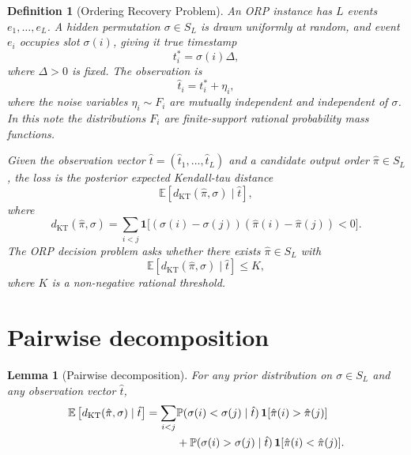\documentclass[11pt]{article}
\newtheorem{definition}{Definition}
\newtheorem{lemma}{Lemma}
\newcommand{\E}{\mathbb{E}}
\newcommand{\Prb}{\mathbb{P}}
\newcommand{\ind}{\mathbf{1}}
\newcommand{\KT}{\operatorname{KT}}
\begin{document}
\begin{definition}[Ordering Recovery Problem]
An ORP instance has $L$ events $e_1,\ldots,e_L$.  A hidden permutation $\sigma\in S_L$ is drawn uniformly at random, and event $e_i$ occupies slot $\sigma(i)$, giving it true timestamp
\begin{equation}
  t_i^*=\sigma(i)\Delta,
\end{equation}
where $\Delta>0$ is fixed.  The observation is
\begin{equation}
  \hat t_i=t_i^*+\eta_i,
\end{equation}
where the noise variables $\eta_i\sim F_i$ are mutually independent and independent of $\sigma$.  In this note the distributions $F_i$ are finite-support rational probability mass functions.

Given the observation vector $\hat t=(\hat t_1,\ldots,\hat t_L)$ and a candidate output order $\hat\pi\in S_L$, the loss is the posterior expected Kendall-tau distance
\begin{equation}
  \E\left[d_{\KT}(\hat\pi,\sigma)\mid \hat t\right],
\end{equation}
where
\begin{equation}
  d_{\KT}(\hat\pi,\sigma)
  =\sum_{i<j}
  \ind\!\big[(\sigma(i)-\sigma(j))(\hat\pi(i)-\hat\pi(j))<0\big].
\end{equation}
The ORP decision problem asks whether there exists $\hat\pi\in S_L$ with
\begin{equation}
  \E\left[d_{\KT}(\hat\pi,\sigma)\mid \hat t\right]\le K,
\end{equation}
where $K$ is a non-negative rational threshold.
\end{definition}

\section{Pairwise decomposition}

\begin{lemma}[Pairwise decomposition]\label{lem:pairwise}
For any prior distribution on $\sigma\in S_L$ and any observation vector $\hat t$,
\begin{align}
  \E\left[d_{\KT}(\hat\pi,\sigma)\mid \hat t\right]
  =\sum_{i<j} &\Prb(\sigma(i)<\sigma(j)\mid \hat t)\,\ind[\hat\pi(i)>\hat\pi(j)] \notag\\
  &+\Prb(\sigma(i)>\sigma(j)\mid \hat t)\,\ind[\hat\pi(i)<\hat\pi(j)].
\end{align}
\end{lemma}
\end{document}
